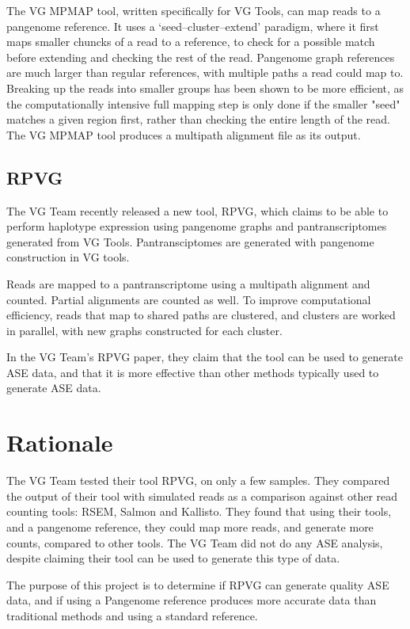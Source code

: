 \documentclass{article}
\begin{document}
The VG MPMAP tool, written specifically for VG Tools,
can map reads to a pangenome reference. It uses a ‘seed–cluster–extend’ paradigm, where it first 
maps smaller chuncks of a read to a reference, to check for a possible match before extending 
and checking the rest of the read. Pangenome graph references are much larger than regular references, 
with multiple paths a read could map to. Breaking up the reads into smaller groups has been shown to be 
more efficient, as the computationally intensive full mapping step is only done if the smaller
"seed" matches a given region first, rather than checking the entire length of the read. 
The VG MPMAP tool produces a multipath alignment file as its output.
\citep{Chang_2019} \citep{Garrison_2018}  

\subsection{RPVG}

The VG Team recently released a new tool, RPVG, which claims to be able to perform haplotype
expression using pangenome graphs and pantranscriptomes generated from VG Tools. Pantransciptomes
are generated with pangenome construction in VG tools. 

Reads are mapped to a pantranscriptome using a multipath alignment and counted. Partial alignments 
are counted as well. To improve 
computational efficiency, reads that map to shared paths are clustered, and clusters are
worked in parallel, with new graphs constructed for each cluster. 

In the VG Team's RPVG paper, they claim that the tool can be used to generate ASE data, and that 
it is more effective than other methods typically used to generate ASE data. \citep{Sibbesen_2023} 

\section{Rationale}

The VG Team tested their tool RPVG, on only a few samples. They compared the output of their tool
with simulated reads as a comparison against other read counting tools: RSEM, Salmon and Kallisto. 
They found that using their tools, and a pangenome reference, they could map more reads,
and generate more counts, compared to other tools. The VG Team did not do any ASE analysis, 
despite claiming their tool can be used to generate this type of data. 

The purpose of this project is to determine if RPVG can generate quality ASE data, and if
using a Pangenome reference produces more accurate data than traditional methods and using
a standard reference.
\end{document}
